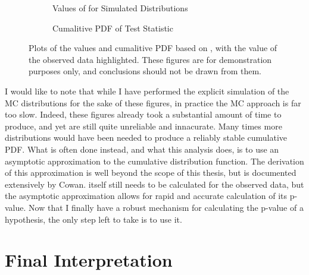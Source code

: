     \begin{figure} %
        \centering
        \begin{subfigure}{0.4\textwidth} 
             
            \caption{Values of \qtil for Simulated Distributions}
            \label{fig:qtil:pdf}
        \end{subfigure}
        \begin{subfigure}{0.4\textwidth}
             
            \caption{Cumalitive PDF of \qtil Test Statistic}
            \label{fig:qtil:Cpdf}
        \end{subfigure}
        \caption{
            Plots of the values and cumalitive PDF based on \qtil,
                with the \qtil value of the observed data highlighted.
            These figures are for demonstration purposes only,
                and conclusions should not be drawn from them.
        }
    \end{figure}

    I would like to note that while I have performed the explicit simulation of the MC distributions for the sake of these figures,
        in practice the MC approach is far too slow.
    Indeed, these figures already took a substantial amount of time to produce, and yet are still quite unreliable and innacurate.
    Many times more distributions would have been needed to produce a reliably stable cumulative PDF.
    What is often done instead, and what this analysis does,
        is to use an asymptotic approximation to the \qtil cumulative distribution function.
    The derivation of this approximation is well beyond the scope of this thesis,
        but is documented extensively by Cowan\cite{asymptotic_formulae_for_likelihood}.
    \qtil itself still needs to be calculated for the observed data,
        but the asymptotic approximation allows for rapid and accurate calculation of its p-value.
    Now that I finally have a robust mechanism for calculating the p-value of a hypothesis,
        the only step left to take is to use it.

\FloatBarrier
\section{Final Interpretation}


